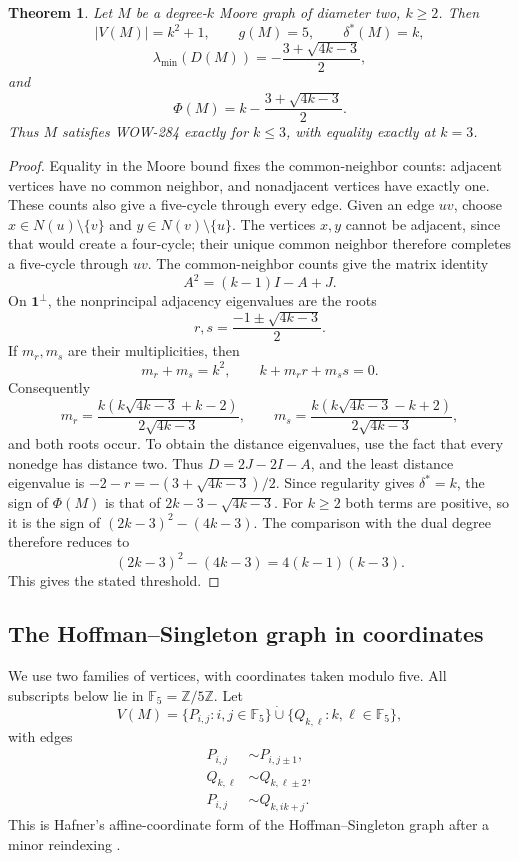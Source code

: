 \documentclass[a4paper,10pt,reqno]{amsart}
\theoremstyle{plain}
\newtheorem{theorem}{Theorem}[section]
\theoremstyle{definition}
\theoremstyle{remark}
\newcommand{\F}{\mathbb F_5}
\newcommand{\one}{\mathbf 1}
\begin{document}
\begin{theorem}\label{thm:moore-threshold}
Let \(M\) be a degree-\(k\) Moore graph of diameter two, \(k\ge2\).  Then
\[
 |V(M)|=k^2+1,
 \qquad g(M)=5,
 \qquad \delta^*(M)=k,
\]
\[
 \lambda_{\min}(D(M))=-\frac{3+\sqrt{4k-3}}2,
\]
and
\[
 \Phi(M)=k-\frac{3+\sqrt{4k-3}}2.
\]
Thus \(M\) satisfies WOW-284 exactly for \(k\le3\), with equality exactly at
\(k=3\).
\end{theorem}

\begin{proof}
Equality in the Moore bound fixes the common-neighbor counts: adjacent
vertices have no common neighbor, and nonadjacent vertices have exactly
one. These counts also give a five-cycle through every edge. Given an edge
\(uv\), choose \(x\in N(u)\setminus\{v\}\) and
\(y\in N(v)\setminus\{u\}\).  The vertices \(x,y\) cannot be adjacent,
since that would create a four-cycle; their unique common neighbor
therefore completes a five-cycle through \(uv\).  The common-neighbor
counts give the matrix identity
\[
 A^2=(k-1)I-A+J.
\]
On \(\one^\perp\), the nonprincipal adjacency eigenvalues are the roots
\[
 r,s=\frac{-1\pm\sqrt{4k-3}}2.
\]
If \(m_r,m_s\) are their multiplicities, then
\[
 m_r+m_s=k^2,\qquad k+m_rr+m_ss=0.
\]
Consequently
\[
 m_r=\frac{k(k\sqrt{4k-3}+k-2)}{2\sqrt{4k-3}},
 \qquad
 m_s=\frac{k(k\sqrt{4k-3}-k+2)}{2\sqrt{4k-3}},
\]
and both roots occur. To obtain the distance eigenvalues, use the fact
that every nonedge has distance two. Thus \(D=2J-2I-A\), and the
least distance eigenvalue is \(-2-r=-(3+\sqrt{4k-3})/2\).
Since regularity gives \(\delta^*=k\), the sign of \(\Phi(M)\) is that of
\(2k-3-\sqrt{4k-3}\). For \(k\ge2\) both terms are positive, so it is the
sign of \((2k-3)^2-(4k-3)\). The comparison with the dual degree
therefore reduces to
\[
 (2k-3)^2-(4k-3)=4(k-1)(k-3).
\]
This gives the stated threshold.
\end{proof}

\subsection{The Hoffman--Singleton graph in coordinates}

We use two families of vertices, with coordinates taken modulo five.
All subscripts below lie in \(\F=\mathbb Z/5\mathbb Z\). Let
\[
 V(M)=\{P_{i,j}:i,j\in\F\}\mathbin{\dot\cup}
      \{Q_{k,\ell}:k,\ell\in\F\},
\]
with edges
\begin{align*}
 P_{i,j}&\sim P_{i,j\pm1},\\
 Q_{k,\ell}&\sim Q_{k,\ell\pm2},\\
 P_{i,j}&\sim Q_{k,ik+j}.
\end{align*}
This is Hafner's affine-coordinate form of the Hoffman--Singleton graph after a
minor reindexing \cite{Hafner2003}.
\end{document}

